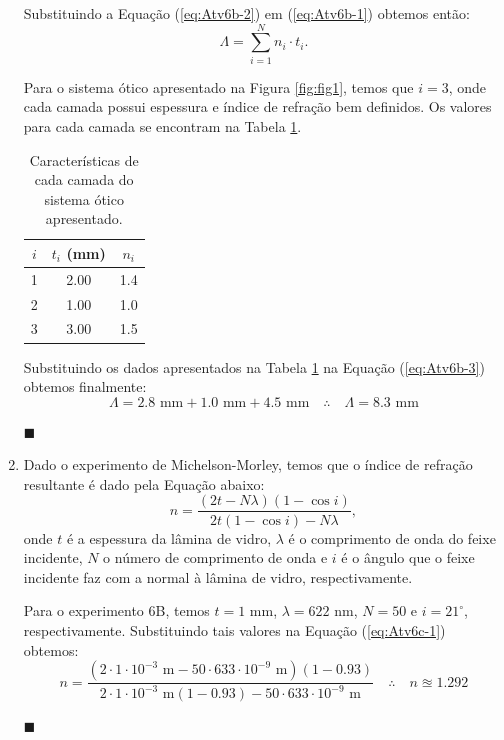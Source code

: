 \documentclass[12pt,a4paper]{article}
\begin{document}
\begin{enumerate}[label = \alph*)]
    Substituindo a Equação (\ref{eq:Atv6b-2}) em (\ref{eq:Atv6b-1}) obtemos então:
    \begin{equation} \label{eq:Atv6b-3}
        \Lambda=\sum_{i=1}^{N}n_i\cdot t_i.
    \end{equation}

    Para o sistema ótico apresentado na Figura \ref{fig:fig1}, temos que $i=3$, onde cada camada possui espessura e índice de refração bem definidos. Os valores para cada camada se encontram na Tabela \ref{tab:Atv6b-1}.
    \begin{table}[htp!]
        \centering
        \begin{tabular}{|c|c|c|}
            \hline
             $i$ & $t_i$ (mm) & $n_i$ \\
             \hline
             1 & 2.00 & 1.4 \\
             2 & 1.00 & 1.0 \\
             3 & 3.00 & 1.5 \\
             \hline
        \end{tabular}
        \caption{Características de cada camada do sistema ótico apresentado.}
        \label{tab:Atv6b-1}
    \end{table}

    Substituindo os dados apresentados na Tabela \ref{tab:Atv6b-1} na Equação (\ref{eq:Atv6b-3}) obtemos finalmente:
    \begin{equation}\label{eq:Atv6b-4}
        \Lambda=2.8\text{ mm}+1.0\text{ mm}+4.5\text{ mm}\quad\therefore\quad\boxed{\Lambda=8.3\text{ mm}}
    \end{equation}
    \begin{flushright}
        $\blacksquare$
    \end{flushright}



    \item Dado o experimento de Michelson-Morley, temos que o índice de refração resultante é dado pela Equação abaixo:
    \begin{equation}\label{eq:Atv6c-1}
        n=\frac{(2t-N\lambda)(1-\cos{i})}{2t(1-\cos{i})-N\lambda},
    \end{equation}
    onde $t$ é a espessura da lâmina de vidro, $\lambda$ é o comprimento de onda do feixe incidente, $N$ o número de comprimento de onda e $i$ é o ângulo que o feixe incidente faz com a normal à lâmina de vidro, respectivamente.

    Para o experimento 6B, temos $t=1\text{ mm}$, $\lambda=622\text{ nm}$, $N=50$ e $i=21^{\circ}$, respectivamente. Substituindo tais valores na Equação (\ref{eq:Atv6c-1}) obtemos:
    \begin{equation}\label{eq:Atv6c-2}
        n=\frac{(2\cdot1\cdot10^{-3}\text{ m}-50\cdot633\cdot10^{-9}\text{ m})(1-0.93)}{2\cdot1\cdot10^{-3}\text{ m}(1-0.93)-50\cdot633\cdot10^{-9}\text{ m}}\quad\therefore\quad\boxed{n\approxeq1.292}
    \end{equation}
    \begin{flushright}
        $\blacksquare$
    \end{flushright}




\end{enumerate}
\end{document}
